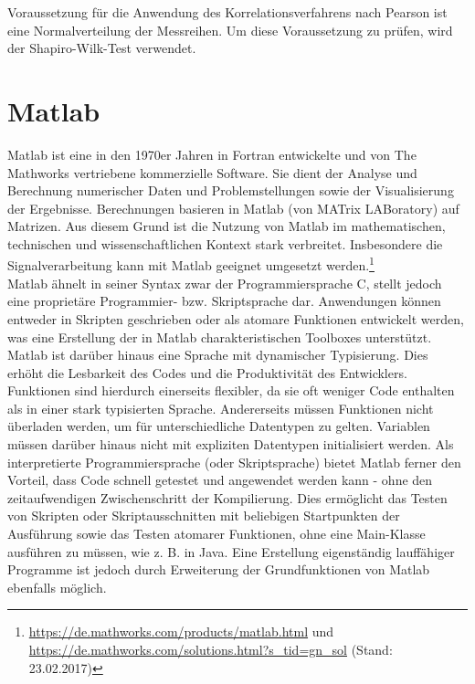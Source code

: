 Voraussetzung für die Anwendung des Korrelationsverfahrens nach Pearson ist eine Normalverteilung der Messreihen. Um diese Voraussetzung zu prüfen, wird der Shapiro-Wilk-Test verwendet.

\section{Matlab}

Matlab ist eine in den 1970er Jahren in Fortran entwickelte und von The Mathworks vertriebene kommerzielle Software. Sie dient der Analyse und Berechnung numerischer Daten und Problemstellungen sowie der Visualisierung der Ergebnisse. Berechnungen basieren in Matlab (von MATrix LABoratory) auf Matrizen. Aus diesem Grund ist die Nutzung von Matlab im mathematischen, technischen und wissenschaftlichen Kontext stark verbreitet. Insbesondere die Signalverarbeitung kann mit Matlab geeignet umgesetzt werden.\footnote{\url{https://de.mathworks.com/products/matlab.html} und \url{https://de.mathworks.com/solutions.html?s_tid=gn_sol} (Stand: 23.02.2017)}\\

Matlab ähnelt in seiner Syntax zwar der Programmiersprache C, stellt jedoch eine proprietäre Programmier- bzw. Skriptsprache dar. Anwendungen können entweder in Skripten geschrieben oder als atomare Funktionen entwickelt werden, was eine Erstellung der in Matlab charakteristischen Toolboxes unterstützt. Matlab ist darüber hinaus eine Sprache mit dynamischer Typisierung. Dies erhöht die Lesbarkeit des Codes und die Produktivität des Entwicklers. Funktionen sind hierdurch einerseits flexibler, da sie oft weniger Code enthalten als in einer stark typisierten Sprache. Andererseits müssen Funktionen nicht überladen werden, um für unterschiedliche Datentypen zu gelten. Variablen müssen darüber hinaus nicht mit expliziten Datentypen initialisiert werden. Als interpretierte Programmiersprache (oder Skriptsprache) bietet Matlab ferner den Vorteil, dass Code schnell getestet und angewendet werden kann - ohne den zeitaufwendigen Zwischenschritt der Kompilierung. Dies ermöglicht das Testen von Skripten oder Skriptausschnitten mit beliebigen Startpunkten der Ausführung sowie das Testen atomarer Funktionen, ohne eine Main-Klasse ausführen zu müssen, wie z. B. in Java. Eine Erstellung eigenständig lauffähiger Programme ist jedoch durch Erweiterung der Grundfunktionen von Matlab ebenfalls möglich. \parencite{stein_programmieren_2012}\\

